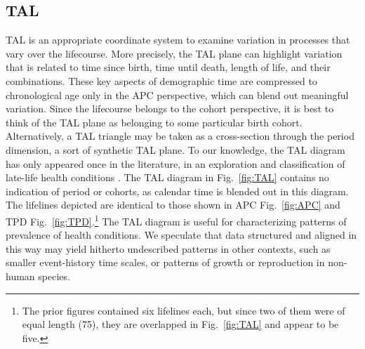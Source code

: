 \documentclass[12pt,oneside,a4paper]{article} %
\newcommand\tgh[1]{\raisebox{-.25\height}{\texttt{[image: Figures/triadtable/triad\#1.pdf]}}}
\begin{document}
\subsection{TAL}%
\FloatBarrier  
TAL is an appropriate coordinate
system to examine variation in processes that vary over the lifecourse.
More precisely, the TAL plane can highlight variation that is related to time
since birth, time until death, length of life, and their combinations. These
key aspects of demographic time are compressed to chronological age only in the
APC perspective, which can blend out meaningful variation. Since the lifecourse belongs to the cohort perspective, it is best to think of the TAL plane as belonging to some particular birth cohort. Alternatively, a TAL triangle may be taken as a cross-section through the period dimension, a sort of synthetic TAL plane. To our knowledge, the TAL diagram has only appeared once in the literature, in an exploration and classification of late-life health
conditions \citep{riffe2015ttd}. The TAL diagram in Fig.~\ref{fig:TAL} contains
no indication of period or cohorts, as calendar time is blended out in this
diagram.
The lifelines depicted are identical to those shown in APC Fig.~\ref{fig:APC} and TPD Fig.~\ref{fig:TPD}.\footnote{The prior figures contained six lifelines each, but since two of them were of equal length (75), they are overlapped in
Fig.~\ref{fig:TAL} and appear to be five.} The TAL diagram is useful for
characterizing patterns of prevalence of health conditions. We speculate
that data structured and aligned in this way may yield hitherto undescribed
patterns in other contexts, such as smaller event-history time scales, or
patterns of growth or reproduction in non-human species.
\end{document}
